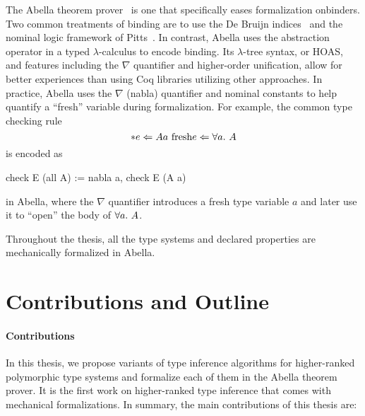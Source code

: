 The Abella theorem prover~\citep{AbellaDesc}
is one that specifically eases formalization onbinders.
Two common treatments of binding
are to use the De Bruijn indices~\citep{DEBRUIJN1972381}
and the nominal logic framework of Pitts~\citep{PITTS2003165}.
In contrast, Abella uses the abstraction operator
in a typed $\lambda$-calculus to encode binding.
Its $\lambda$-tree syntax, or HOAS, and features including the $\nabla$ quantifier
and higher-order unification, allow for better experiences than using Coq libraries
utilizing other approaches.
In practice, Abella uses the $\nabla$ (nabla) quantifier and nominal constants to help
quantify a ``fresh'' variable during formalization.
For example, the common type checking rule
$$\inferrule*{e \Lto A \\ a \text{ fresh}}{e \Lto \all A}$$
is encoded as
\begin{abella}
  check E (all A) := nabla a, check E (A a)
\end{abella}
in Abella, where the $\nabla$ quantifier introduces a fresh type variable $a$
and later use it to ``open'' the body of $\all A$.

Throughout the thesis, all the type systems and declared properties are
mechanically formalized in Abella.



\section{Contributions and Outline}

\paragraph{Contributions}

In this thesis, we propose variants of type inference algorithms
for higher-ranked polymorphic type systems
and formalize each of them in the Abella theorem prover.
It is the first work on higher-ranked type inference
that comes with mechanical formalizations.
In summary, the main contributions of this thesis are:



